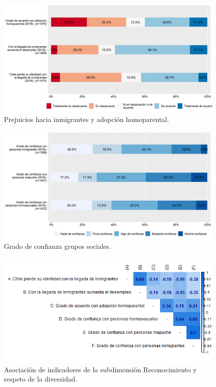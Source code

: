 \documentclass[
  12pt,
]{book}
\begin{document}
\begin{figure}[H]

{\centering \includegraphics[width=1\linewidth,height=1\textheight]{output/graphs/prejuicios} 

}

\caption{Prejuicios hacia inmigrantes y adopción homoparental.}\label{fig:prejuicios}
\end{figure}

\begin{figure}[H]

{\centering \includegraphics[width=1\linewidth,height=1\textheight]{output/graphs/diversidad} 

}

\caption{Grado de confianza grupos sociales.}\label{fig:diversidad}
\end{figure}

\begin{figure}[H]

{\centering \includegraphics[width=1\linewidth,height=1\textheight]{output/graphs/diversidad_cor} 

}

\caption{Asociación de indicadores de la subdimensión Reconocimiento y respeto de la diversidad.}\label{fig:diversidad-cor}
\end{figure}
\end{document}
